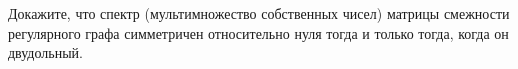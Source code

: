 Докажите, что спектр (мультимножество собственных чисел) матрицы смежности регулярного графа симметричен
относительно нуля тогда и только тогда, когда он двудольный.
